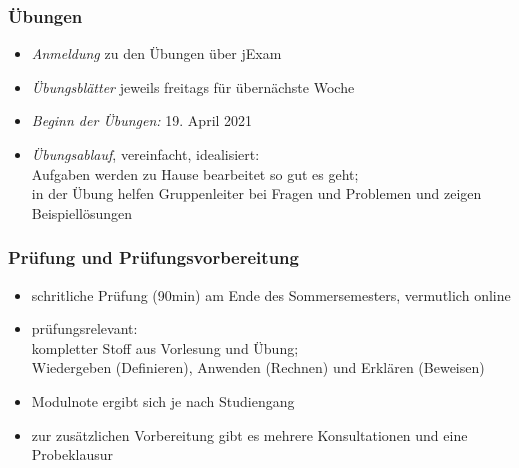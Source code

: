 \documentclass[aspectratio=1610,onlymath]{beamer}
\begin{document}
\begin{frame}\frametitle{Übungen}
\begin{itemize}
\item \emph{Anmeldung} zu den Übungen über jExam
\item \emph{Übungsblätter} jeweils freitags für übernächste Woche
\item \emph{Beginn der Übungen:} 19. April 2021
\item \emph{Übungsablauf}, vereinfacht, idealisiert:\\
	Aufgaben werden zu Hause bearbeitet so gut es geht;\\
	in der Übung helfen Gruppenleiter bei Fragen und Problemen und zeigen Beispiellösungen
\end{itemize}

\end{frame}


\begin{frame}\frametitle{Prüfung und Prüfungsvorbereitung}
\begin{itemize}
\item schritliche Prüfung (90min) am Ende des Sommersemesters, vermutlich online
\item prüfungsrelevant:\\
	kompletter Stoff aus Vorlesung \alert{und} Übung;\\
	Wiedergeben (Definieren), Anwenden (Rechnen) und Erklären (Beweisen)
\item Modulnote ergibt sich je nach Studiengang
\item zur zusätzlichen Vorbereitung gibt es \alert{mehrere Konsultationen} und \alert{eine Probeklausur}
\end{itemize}

\end{frame}
\end{document}
